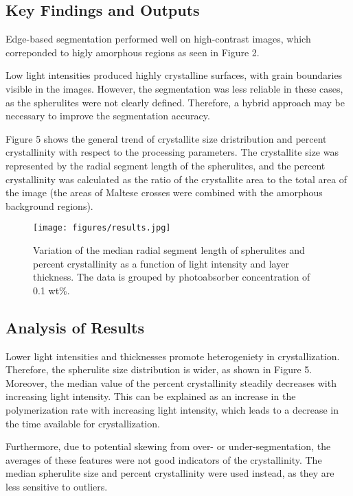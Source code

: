 \documentclass[12pt]{article}
\begin{document}
\subsection{Key Findings and Outputs}
Edge-based segmentation performed well on high-contrast images, which correponded to higly amorphous regions as seen in Figure 2.

Low light intensities produced highly crystalline surfaces, with grain boundaries visible in the images. However,
the segmentation was less reliable in these cases, as the spherulites were not clearly defined. Therefore, a hybrid 
approach may be necessary to improve the segmentation accuracy.

Figure 5 shows the general trend of crystallite size dristribution and percent crystallinity with respect to the processing parameters.
The crystallite size was represented by the radial segment length of the spherulites, and the percent crystallinity was calculated 
as the ratio of the crystallite area to the total area of the image (the areas of Maltese crosses were combined with the amorphous background regions).

\begin{figure}[ht]
    \centering
    \texttt{[image: figures/results.jpg]}
    \caption{\centering Variation of the median radial segment length of spherulites and percent crystallinity as a function of light intensity and layer thickness.
    The data is grouped by photoabsorber concentration of 0.1 wt\%.}
\end{figure}


\subsection{Analysis of Results}
Lower light intensities and thicknesses promote heterogeniety in crystallization. Therefore, the spherulite 
size distribution is wider, as shown in Figure 5. Moreover, the median value of the percent crystallinity steadily decreases 
with increasing light intensity. This can be explained as an increase in the polymerization rate with increasing light intensity, which leads 
to a decrease in the time available for crystallization.

Furthermore, due to potential skewing from over- or under-segmentation, the averages of these features were not good
indicators of the crystallinity. The median spherulite size and percent crystallinity were used instead, as they are less sensitive to outliers.
\end{document}
